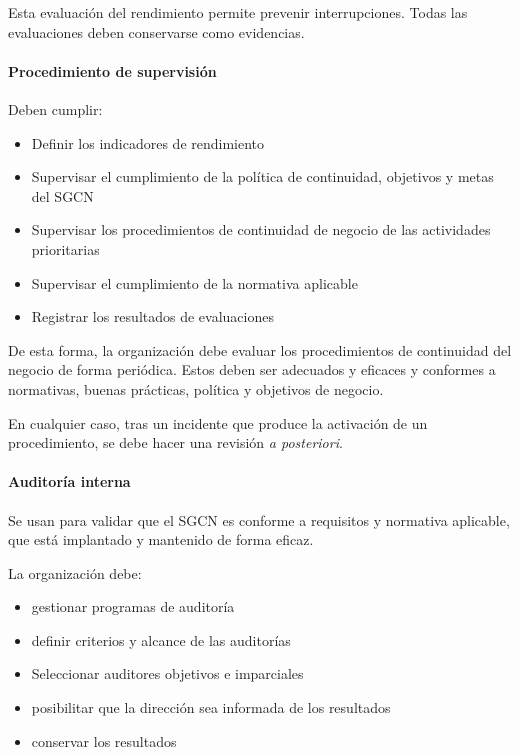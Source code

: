         Esta evaluación del rendimiento permite prevenir interrupciones. Todas las evaluaciones deben conservarse como evidencias.

        \paragraph{Procedimiento de supervisión}
            Deben cumplir:
            \begin{itemize}
                \item Definir los indicadores de rendimiento
                \item Supervisar el cumplimiento de la política de continuidad, objetivos y metas del SGCN
                \item Supervisar los procedimientos de continuidad de negocio de las actividades prioritarias
                \item Supervisar el cumplimiento de la normativa aplicable
                \item Registrar los resultados de evaluaciones
            \end{itemize}

            De esta forma, la organización debe evaluar los procedimientos de continuidad del negocio de forma periódica. Estos deben ser adecuados y eficaces y conformes a normativas, buenas prácticas, política y objetivos de negocio.

            En cualquier caso, tras un incidente que produce la activación de un procedimiento, se debe hacer una revisión \textit{a posteriori}.

        \paragraph{Auditoría interna}
            Se usan para validar que el SGCN es conforme a requisitos y normativa aplicable, que está implantado y mantenido de forma eficaz.

            La organización debe:
            \begin{itemize}
                \item gestionar programas de auditoría
                \item definir criterios y alcance de las auditorías
                \item Seleccionar auditores objetivos e imparciales
                \item posibilitar que la dirección sea informada de los resultados
                \item conservar los resultados
            \end{itemize}

